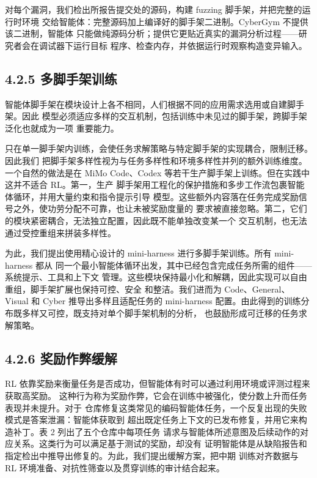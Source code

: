 对每个漏洞，我们检出所报告提交处的源码，构建 fuzzing 脚手架，并把完整的运行时环境
交给智能体：完整源码加上编译好的脚手架二进制。CyberGym 不提供该二进制，智能体
只能做纯源码分析；提供它更贴近真实的漏洞分析过程——研究者会在调试器下运行目标
程序、检查内存，并依据运行时观察构造变异输入。



\subsection{4.2.5 多脚手架训练}\label{multi-harness-training}

智能体脚手架在模块设计上各不相同，人们根据不同的应用需求选用或自建脚手架。因此
模型必须适应多样的交互机制，包括训练中未见过的脚手架，跨脚手架泛化也就成为一项
重要能力。

只在单一脚手架内训练，会使任务求解策略与特定脚手架的实现耦合，限制迁移。因此我们
把脚手架多样性视为与任务多样性和环境多样性并列的额外训练维度。一个自然的做法是在
MiMo Code、Codex 等若干生产脚手架上训练。但在实践中这并不适合 RL。第一，生产
脚手架用工程化的保护措施和多步工作流包裹智能体循环，并用大量约束和指令提示引导
模型。这些额外内容落在任务完成奖励信号之外，使功劳分配不可靠，也让未被奖励度量的
要求被直接忽略。第二，它们的模块紧密耦合，无法独立配置，因此既不能单独改变某一个
交互机制，也无法通过受控重组来拼装多样性。

为此，我们提出使用精心设计的 mini-harness 进行多脚手架训练。所有 mini-harness 都从
同一个最小智能体循环出发，其中已经包含完成任务所需的组件——系统提示、工具和上下文
管理。这些模块保持最小化和解耦，因此实现可以自由重组，脚手架扩展也保持可控、安全
和整洁。我们进而为 Code、General、Visual 和 Cyber 推导出多样且适配任务的
mini-harness 配置。由此得到的训练分布既多样又可控，既支持对单个脚手架机制的分析，
也鼓励形成可迁移的任务求解策略。

\subsection{4.2.6 奖励作弊缓解}\label{reward-hacking-mitigation}

RL 依靠奖励来衡量任务是否成功，但智能体有时可以通过利用环境或评测过程来获取高奖励。
这种行为称为奖励作弊，它会在训练中被强化，使分数上升而任务表现并未提升。对于
仓库修复这类常见的编码智能体任务，一个反复出现的失败模式是答案泄漏：智能体获取到
超出既定任务上下文的已发布修复，并用它来构造补丁。表 2 列出了五个仓库中每项任务
请求与智能体所述意图及后续动作的对应关系。这类行为可以满足基于测试的奖励，却没有
证明智能体是从缺陷报告和指定检出中推导出修复的。为此，我们提出缓解方案，把中期
训练对齐数据与 RL 环境准备、对抗性筛查以及贯穿训练的审计结合起来。

